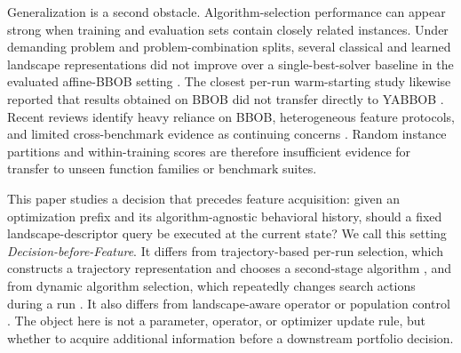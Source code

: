 Generalization is a second obstacle. Algorithm-selection performance can appear strong when training and evaluation sets contain closely related instances. Under demanding problem and problem-combination splits, several classical and learned landscape representations did not improve over a single-best-solver baseline in the evaluated affine-BBOB setting \cite{cenikjLandscapeFeaturesSingleobjective2025}. The closest per-run warm-starting study likewise reported that results obtained on BBOB did not transfer directly to YABBOB \cite{kostovskaPerrunAlgorithmSelection2022}. Recent reviews identify heavy reliance on BBOB, heterogeneous feature protocols, and limited cross-benchmark evidence as continuing concerns \cite{cenikjSurveyFeaturesUsed2026}. Random instance partitions and within-training scores are therefore insufficient evidence for transfer to unseen function families or benchmark suites.

This paper studies a decision that precedes feature acquisition: given an optimization prefix and its algorithm-agnostic behavioral history, should a fixed landscape-descriptor query be executed at the current state? We call this setting \emph{Decision-before-Feature}. It differs from trajectory-based per-run selection, which constructs a trajectory representation and chooses a second-stage algorithm \cite{jankovicTrajectorybasedAlgorithmSelection2022,kostovskaPerrunAlgorithmSelection2022}, and from dynamic algorithm selection, which repeatedly changes search actions during a run \cite{guoDeepReinforcementLearning2024b}. It also differs from landscape-aware operator or population control \cite{sallamLandscapebasedAdaptiveOperator2017,zhouAdaptiveMultipopulationArtificial2024}. The object here is not a parameter, operator, or optimizer update rule, but whether to acquire additional information before a downstream portfolio decision.

